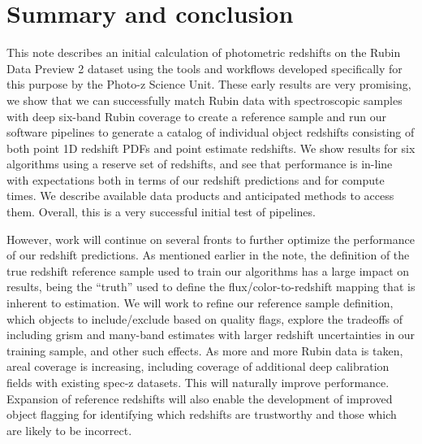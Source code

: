 \section{Summary and conclusion}
\label{sec:summary:0}

This note describes an initial calculation of photometric redshifts on the Rubin Data Preview 2 dataset using the tools and workflows developed specifically for this purpose by the Photo-z Science Unit.  These early results are very promising, we show that we can successfully match Rubin data with spectroscopic samples with deep six-band Rubin coverage to create a reference sample and run our software pipelines to generate a catalog of individual object redshifts consisting of both point 1D redshift PDFs and point estimate redshifts.  We show results for six \photoz algorithms using a reserve set of redshifts, and see that \photoz performance is in-line with expectations both in terms of our redshift predictions and for compute times.  We describe available data products and anticipated methods to access them.  Overall, this is a very successful initial test of \photoz pipelines.

However, work will continue on several fronts to further optimize the performance of our redshift predictions.  As mentioned earlier in the note, the definition of the true redshift reference sample used to train our algorithms has a large impact on results, being the ``truth'' used to define the flux/color-to-redshift mapping that is inherent to \photoz estimation.  We will work to refine our reference sample definition, which objects to include/exclude based on quality flags, explore the tradeoffs of including grism and many-band \photoz estimates with larger redshift uncertainties in our training sample, and other such effects.  As more and more Rubin data is taken, areal coverage is increasing, including coverage of additional deep calibration fields with existing spec-z datasets.  This will naturally improve \photoz performance.  Expansion of reference redshifts will also enable the development of improved object flagging for identifying which redshifts are trustworthy and those which are likely to be incorrect.

